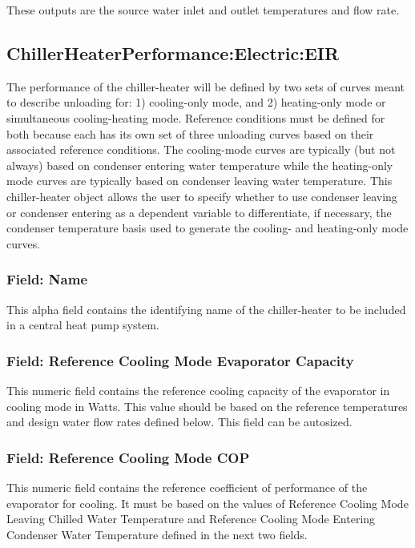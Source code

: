 These outputs are the source water inlet and outlet temperatures and flow rate.

\subsection{ChillerHeaterPerformance:Electric:EIR}\label{chillerheaterperformancelectriceir}

The performance of the chiller-heater will be defined by two sets of curves meant to describe unloading for: 1) cooling-only mode, and 2) heating-only mode or simultaneous cooling-heating mode. Reference conditions must be defined for both because each has its own set of three unloading curves based on their associated reference conditions. The cooling-mode curves are typically (but not always) based on condenser entering water temperature while the heating-only mode curves are typically based on condenser leaving water temperature. This chiller-heater object allows the user to specify whether to use condenser leaving or condenser entering as a dependent variable to differentiate, if necessary, the condenser temperature basis used to generate the cooling- and heating-only mode curves.

\subsubsection{Field: Name}\label{field-name-19-002}

This alpha field contains the identifying name of the chiller-heater to be included in a central heat pump system.

\subsubsection{Field: Reference Cooling Mode Evaporator Capacity}\label{field-reference-cooling-mode-evaporator-capacity}

This numeric field contains the reference cooling capacity of the evaporator in cooling mode in Watts. This value should be based on the reference temperatures and design water flow rates defined below. This field can be autosized.

\subsubsection{Field: Reference Cooling Mode COP}\label{field-reference-cooling-mode-cop}

This numeric field contains the reference coefficient of performance of the evaporator for cooling. It must be based on the values of Reference Cooling Mode Leaving Chilled Water Temperature and Reference Cooling Mode Entering Condenser Water Temperature defined in the next two fields.

